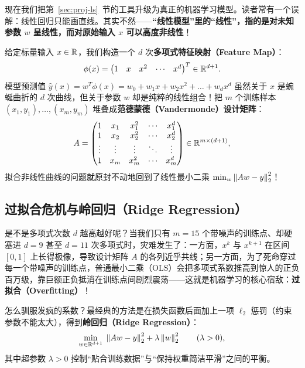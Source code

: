现在我们把第~\ref{sec:proj-ls}~节的工具升级为真正的机器学习模型。读者常有一个误解：线性回归只能画直线。其实不然——\textbf{“线性模型”里的“线性”，指的是对未知参数 $w$ 呈线性，而对原始输入 $x$ 可以高度非线性}！

给定标量输入 $x \in \mathbb{R}$，我们构造一个 $d$ 次\textbf{多项式特征映射（Feature Map）}：
\[
\phi(x) = \begin{pmatrix} 1 & x & x^2 & \cdots & x^d \end{pmatrix}^T \in \mathbb{R}^{d+1}.
\]
模型预测值 $\hat{y}(x) = w^T \phi(x) = w_0 + w_1 x + w_2 x^2 + \dots + w_d x^d$ 虽然关于 $x$ 是蜿蜒曲折的 $d$ 次曲线，但关于参数 $w$ 却是纯粹的线性组合！把 $m$ 个训练样本 $(x_1, y_1), \dots, (x_m, y_m)$ 堆叠成\textbf{范德蒙德（Vandermonde）设计矩阵}：
\[
A = \begin{pmatrix}
1 & x_1 & x_1^2 & \cdots & x_1^d \\
1 & x_2 & x_2^2 & \cdots & x_2^d \\
\vdots & \vdots & \vdots & \ddots & \vdots \\
1 & x_m & x_m^2 & \cdots & x_m^d
\end{pmatrix} \in \mathbb{R}^{m \times (d+1)},
\]
拟合非线性曲线的问题就原封不动地回到了线性最小二乘 $\min_{w} \left\|Aw - y\right\|_2^2$！

\subsection{过拟合危机与岭回归（Ridge Regression）}

是不是多项式次数 $d$ 越高越好呢？当我们只有 $m = 15$ 个带噪声的训练点、却硬塞进 $d = 9$ 甚至 $d = 11$ 次多项式时，灾难发生了：一方面，$x^k$ 与 $x^{k+1}$ 在区间 $[0, 1]$ 上长得极像，导致设计矩阵 $A$ 的各列近乎共线；另一方面，为了死命穿过每一个带噪声的训练点，普通最小二乘（OLS）会把多项式系数推高到惊人的正负百万级，靠巨额正负抵消在训练点间剧烈震荡——这就是机器学习的核心宿敌：\textbf{过拟合（Overfitting）}！

怎么驯服发疯的系数？最经典的方法是在损失函数后面加上一项 $\ell_2$ 惩罚（约束参数不能太大），得到\textbf{岭回归（Ridge Regression）}：
\begin{equation}\label{eq:ridge-obj}
\min_{w \in \mathbb{R}^{d+1}} \; \left\|Aw - y\right\|_2^2 + \lambda \left\|w\right\|_2^2 \qquad (\lambda > 0),
\end{equation}
其中超参数 $\lambda > 0$ 控制“贴合训练数据”与“保持权重简洁平滑”之间的平衡。

